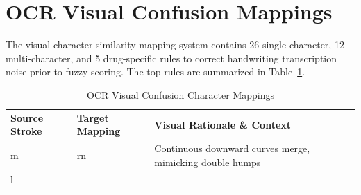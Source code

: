 \documentclass[12pt,a4paper,oneside]{report}
\begin{document}
\section{OCR Visual Confusion
Mappings}\label{ocr-visual-confusion-mappings}

The visual character similarity mapping system contains 26
single-character, 12 multi-character, and 5 drug-specific rules to
correct handwriting transcription noise prior to fuzzy scoring. The top
rules are summarized in Table~\ref{tab:table28}.

\begin{longtable}[]{@{}
  >{\raggedright\arraybackslash}p{}
  >{\raggedright\arraybackslash}p{}
  >{\raggedright\arraybackslash}p{}@{}}
\caption{OCR Visual Confusion Character Mappings\label{tab:table28}}\\

\toprule\noalign{}
\begin{minipage}[b]{\linewidth}\centering
\textbf{Source Stroke}
\end{minipage} & \begin{minipage}[b]{\linewidth}\centering
\textbf{Target Mapping}
\end{minipage} & \begin{minipage}[b]{\linewidth}\raggedright

\textbf{Visual Rationale \& Context}

\end{minipage} \\
\begin{minipage}[b]{\linewidth}\centering
m
\end{minipage} & \begin{minipage}[b]{\linewidth}\centering
rn
\end{minipage} & \begin{minipage}[b]{\linewidth}\raggedright

Continuous downward curves merge, mimicking double humps

\end{minipage} \\
\begin{minipage}[b]{\linewidth}\centering
l
\end{minipage} & \begin{minipage}[b]{\linewidth}\centering
1
\end{minipage} & \begin{minipage}[b]{\linewidth}\raggedright


\end{minipage}
\end{longtable}
\end{document}

